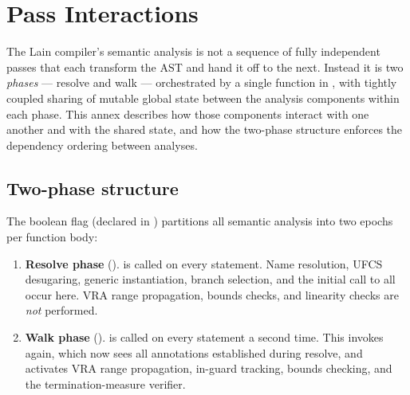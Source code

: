 \chapter{Pass Interactions}
\label{annex:C-pass-interactions}

\pnum
The Lain compiler's semantic analysis is not a sequence of fully independent
passes that each transform the AST and hand it off to the next.  Instead it is
two \emph{phases} — resolve and walk — orchestrated by a single function
 in , with tightly coupled
sharing of mutable global state between the analysis components within each
phase.  This annex describes how those components interact with one another and
with the shared state, and how the two-phase structure enforces the dependency
ordering between analyses.

\section{Two-phase structure}
\label{sec:ci-twophase}

\pnum
The boolean flag  (declared in )
partitions all semantic analysis into two epochs per function body:

\begin{enumerate}
\item \textbf{Resolve phase} ().
   is called on every statement.
  Name resolution, UFCS desugaring, generic instantiation, 
  branch selection, and the initial call to  all occur
  here.  VRA range propagation, bounds checks, and linearity checks are
  \emph{not} performed.

\item \textbf{Walk phase} ().
   is called on every statement a second time.  This invokes
   again, which now sees all  annotations
  established during resolve, and activates VRA range propagation, in-guard
  tracking, bounds checking, and the termination-measure verifier.
\end{enumerate}

